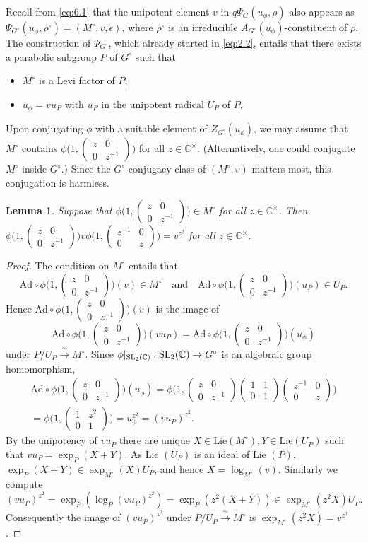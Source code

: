 \documentclass[11pt]{amsart}
\newtheorem{lem}[thm]{Lemma}
\theoremstyle{definition}
\newcommand{\isom}{\xrightarrow{\;\sim\;}}
\newcommand{\C}{\mathbb C}
\newcommand{\matje}[4]{\left(\begin{smallmatrix} #1 & #2 \\ 
#3 & #4 \end{smallmatrix}\right)}
\def\SL{{\rm SL}}
\begin{document}
Recall from \eqref{eq:6.1} that the unipotent element $v$ in $q \Psi_G (u_\phi,\rho)$
also appears as $\Psi_{G^\circ}(u_\phi,\rho^\circ) = (M^\circ,v,\epsilon)$,
where $\rho^\circ$ is an irreducible $A_{G^\circ}(u_\phi)$-constituent of $\rho$.
The construction of $\Psi_{G^\circ}$, which already started in \eqref{eq:2.2},
entails that there exists a parabolic subgroup $P$ of $G^\circ$ such that
\begin{itemize}
\item $M^\circ$ is a Levi factor of $P$,
\item $u_\phi = v u_P$ with $u_P$ in the unipotent radical $U_P$ of $P$.
\end{itemize}
Upon conjugating $\phi$ with a suitable element of $Z_{G^\circ}(u_\phi)$, we may assume 
that $M^\circ$ contains $\phi \big( 1, \matje{z}{0}{0}{z^{-1}} \big)$ for all 
$z \in \C^\times$. (Alternatively, one could conjugate $M^\circ$ inside $G^\circ$.) 
Since the $G^\circ$-conjugacy class of $(M^\circ,v)$ matters most, this conjugation 
is harmless.

\begin{lem}\label{lem:7.11}
Suppose that $\phi \big( 1, \matje{z}{0}{0}{z^{-1}} \big) \in M^\circ$ for all 
$z \in \C^\times$. Then \\ $\phi \big( 1, \matje{z}{0}{0}{z^{-1}} \big) v 
\phi \big( 1, \matje{z^{-1}}{0}{0}{z} \big) = v^{z^2}$ for all $z \in \C^\times$. 
\end{lem}
\begin{proof}
The condition on $M^\circ$ entails that 
\[
\mathrm{Ad} \circ \phi \big( 1, \matje{z}{0}{0}{z^{-1}} \big) (v)
\in M^\circ \quad \text{and} \quad \mathrm{Ad} \circ \phi 
\big( 1, \matje{z}{0}{0}{z^{-1}} \big) (u_P) \in U_P .
\]
Hence $\mathrm{Ad} \circ \phi \big( 1, \matje{z}{0}{0}{z^{-1}} \big) (v)$ is the image of 
\[
\mathrm{Ad} \circ \phi \big( 1, \matje{z}{0}{0}{z^{-1}} \big) (v u_P) = 
\mathrm{Ad} \circ \phi \big( 1, \matje{z}{0}{0}{z^{-1}} \big) (u_\phi)
\] 
under $P / U_P \isom M^\circ$. Since $\phi |_{\SL_2 (\C)} : \SL_2 (\C) \to G^\circ$ is an
algebraic group homomorphism, 
\begin{multline*}
\mathrm{Ad} \circ \phi \big( 1, \matje{z}{0}{0}{z^{-1}} \big) (u_\phi) = \phi \big( 1, 
\matje{z}{0}{0}{z^{-1}} \matje{1}{1}{0}{1} \matje{z^{-1}}{0}{0}{z} \big) \\
= \phi \big( 1, \matje{1}{z^2}{0}{1} \big) = u_\phi^{z^2} = (v u_P)^{z^2} .
\end{multline*}
By the unipotency of $v u_P$ there are unique $X \in \text{Lie} (M^\circ), Y \in 
\text{Lie} (U_P)$ such that $v u_P = \exp_P (X + Y)$. As Lie $(U_P)$ is an ideal of 
Lie $(P)$, $\exp_P (X+Y) \in \exp_{M^\circ} (X) U_P$, and hence $X = \log_{M^\circ} (v)$. 
Similarly we compute
\[
(v u_P)^{z^2} = \exp_P (\log_P (v u_P)^{z^2}) = \exp_P (z^2 (X + Y)) \in 
\exp_{M^\circ} (z^2 X) U_P .
\]
Consequently the image of $(v u_P)^{z^2}$ under $P / U_P \isom M^\circ$ is 
$\exp_{M^\circ} (z^2 X) = v^{z^2}$.
\end{proof}
\end{document}
